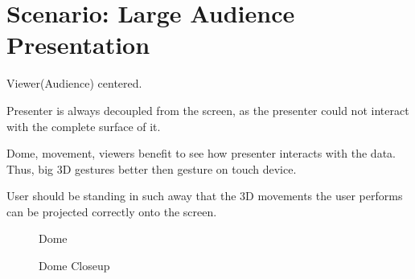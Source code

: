 \documentclass[review,journal]{vgtc}         %
\begin{document}
\section{Scenario: Large Audience Presentation}

Viewer(Audience) centered.

Presenter is always decoupled from the screen, as the presenter could not interact with the complete surface of it.

Dome, movement, viewers benefit to see how presenter interacts with the data.
Thus, big 3D gestures better then gesture on touch device.

User should be standing in such away that the 3D movements the user performs can be projected correctly onto the screen.

\begin{figure}[htb]
	\centering
	\caption{Dome}
	\label{img:dome_clip}
\end{figure}

\begin{figure}[htb]
	\centering
	\caption{Dome Closeup}
	\label{img:dome_tf_change}
\end{figure}
\end{document}

